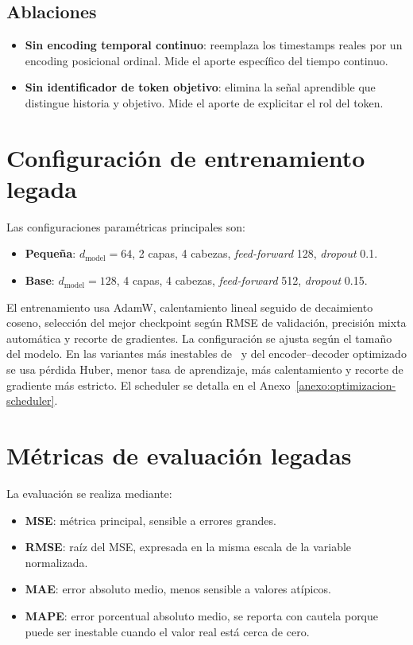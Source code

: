 \subsection{Ablaciones}

\begin{itemize}
	\item \textbf{Sin encoding temporal continuo}: reemplaza los timestamps reales por un encoding posicional ordinal. Mide el aporte específico del tiempo continuo.
	\item \textbf{Sin identificador de token objetivo}: elimina la señal aprendible que distingue historia y objetivo. Mide el aporte de explicitar el rol del token.
\end{itemize}

\section{Configuración de entrenamiento legada}
\label{sec:configuracion-entrenamiento}

Las configuraciones paramétricas principales son:
\begin{itemize}
	\item \textbf{Pequeña}: $d_{\text{model}} = 64$, 2 capas, 4 cabezas, \emph{feed-forward} 128, \emph{dropout} 0.1.
	\item \textbf{Base}: $d_{\text{model}} = 128$, 4 capas, 4 cabezas, \emph{feed-forward} 512, \emph{dropout} 0.15.
\end{itemize}

El entrenamiento usa AdamW, calentamiento lineal seguido de decaimiento coseno, selección del mejor checkpoint según RMSE de validación, precisión mixta automática y recorte de gradientes. La configuración se ajusta según el tamaño del modelo. En las variantes más inestables de \CTTransformer\ y del encoder--decoder optimizado se usa pérdida Huber, menor tasa de aprendizaje, más calentamiento y recorte de gradiente más estricto. El scheduler se detalla en el Anexo~\ref{anexo:optimizacion-scheduler}.

\section{Métricas de evaluación legadas}
\label{sec:metricas-evaluacion-experimentos}

La evaluación se realiza mediante:
\begin{itemize}
	\item \textbf{MSE}: métrica principal, sensible a errores grandes.
	\item \textbf{RMSE}: raíz del MSE, expresada en la misma escala de la variable normalizada.
	\item \textbf{MAE}: error absoluto medio, menos sensible a valores atípicos.
	\item \textbf{MAPE}: error porcentual absoluto medio, se reporta con cautela porque puede ser inestable cuando el valor real está cerca de cero.
\end{itemize}

